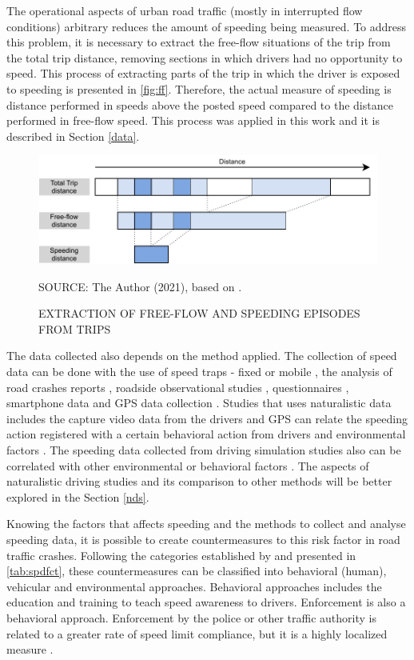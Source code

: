 The operational aspects of urban road traffic (mostly in interrupted flow conditions) arbitrary reduces the amount of speeding being measured. To address this problem, it is necessary to extract the free-flow situations of the trip from the total trip distance, removing sections in which drivers had no opportunity to speed. This process of extracting parts of the trip in which the driver is exposed to speeding is presented in \autoref{fig:ff}. Therefore, the actual measure of speeding is distance performed in speeds above the posted speed compared to the distance performed in free-flow speed. This process was applied in this work and it is described in Section \ref{data}. 

\begin{figure}[!htbp]
    \centering\footnotesize
    \captionsetup{font=footnotesize}
    \caption{EXTRACTION OF FREE-FLOW AND SPEEDING EPISODES FROM TRIPS}
    \includegraphics{fig/richards.pdf}
    \label{fig:ff}
    \par SOURCE: The Author (2021), based on \textcite{Richard2013}.
\end{figure}

The data collected also depends on the method applied. The collection of speed data can be done with the use of speed traps - fixed or mobile \cite{Hidalgo-Solorzano2020, WHO2008}, the analysis of road crashes reports \cite{Watson2015}, roadside observational studies \cite{Shinar2017}, questionnaires \cite{Dinh2013}, smartphone data \cite{Warren2019} and GPS data collection \cite{Moreno2013, Wang2018}. Studies that uses naturalistic data includes the capture video data from the drivers and GPS can relate the speeding action registered with a certain behavioral action from drivers \cite{Bastos2020a} and environmental factors \cite{Moreno2013}. The speeding data collected from driving simulation studies also can be correlated with other environmental or behavioral factors \cite{Yadav2020}. The aspects of naturalistic driving studies and its comparison to other methods will be better explored in the Section \ref{nds}. 

Knowing the factors that affects speeding and the methods to collect and analyse speeding data, it is possible to create countermeasures to this risk factor in road traffic crashes. Following the categories established by \textcite{Haddon1980} and presented in \autoref{tab:spdfct}, these countermeasures can be classified into behavioral (human), vehicular and environmental approaches. Behavioral approaches includes the education and training to teach speed awareness to drivers. Enforcement is also a behavioral approach. Enforcement by the police or other traffic authority is related to a greater rate of speed limit compliance, but it is a highly localized measure \cite{Shinar2017}. 

